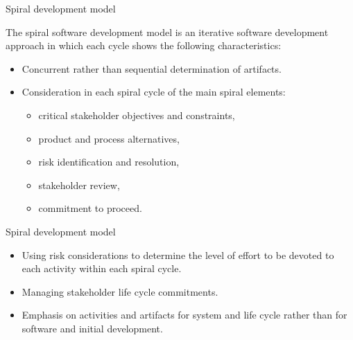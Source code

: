 \documentclass{beamer}
\begin{document}
\begin{frame}{\centerline{Spiral development model}}

The spiral software development model is an iterative software development approach in which each cycle shows the following characteristics:

\begin{itemize}


\item  Concurrent rather than sequential determination of artifacts.

\item  Consideration in each spiral cycle of the main spiral elements:

\begin{itemize}
\item  critical stakeholder objectives and constraints,

\item  product and process alternatives,

\item  risk identification and resolution,

\item  stakeholder review,

\item  commitment to proceed.
\end{itemize}
\end{itemize}
\end{frame}
\begin{frame}{\centerline{Spiral development model}}

\begin{itemize}
\item  Using risk considerations to determine the level of effort to be devoted to each activity within each spiral cycle.

\item  Managing stakeholder life cycle commitments.

\item  Emphasis on activities and artifacts for system and life cycle rather than for software and initial development.

\end{itemize}


\end{frame}
\end{document}
